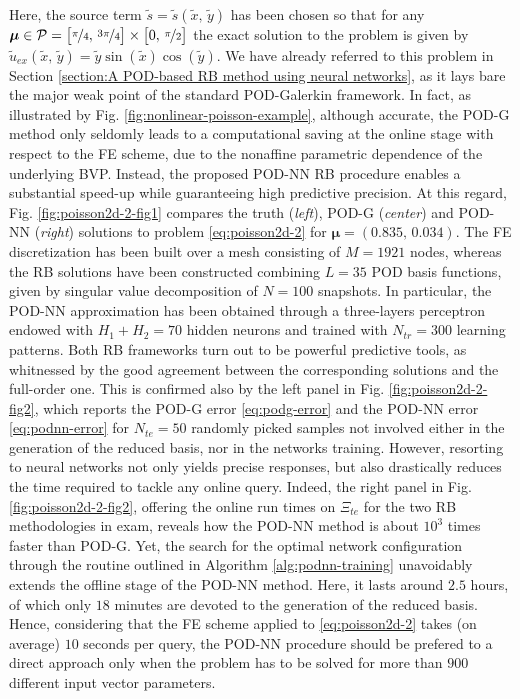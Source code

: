 \documentclass[12pt, a4paper, twoside, openright, notitlepage]{report}
\numberwithin{equation}{chapter}
\theoremstyle{theorem}
\theoremstyle{definition}
\theoremstyle{remark}
\theoremstyle{proposition}
\numberwithin{figure}{chapter}
\newcommand{\wt}[1]{\widetilde{#1}}
\newcommand{\bg}[1]{\boldsymbol{#1}}
\begin{document}
		Here, the source term $\wt{s} = \wt{s}(\wt{x}, \, \wt{y})$ has been chosen so that for any $\bg{\mu} \in \mathcal{P} = \big[ \nicefrac{\pi}{4}, \, \nicefrac{3 \pi}{4} \big] \times \big[ 0, \, \nicefrac{\pi}{2} \big]$ the exact solution to the problem is given by $\wt{u}_{ex}(\wt{x}, \, \wt{y}) = \wt{y} \sin(\wt{x}) \cos(\wt{y})$. We have already referred to this problem in Section \ref{section:A POD-based RB method using neural networks}, as it lays bare the major weak point of the standard POD-Galerkin framework. In fact, as illustrated by Fig. \ref{fig:nonlinear-poisson-example}, although accurate, the POD-G method only seldomly leads to a computational saving at the online stage with respect to the FE scheme, due to the nonaffine parametric dependence of the underlying BVP. Instead, the proposed POD-NN RB procedure enables a substantial speed-up while guaranteeing high predictive precision. At this regard, Fig. \ref{fig:poisson2d-2-fig1} compares the truth (\emph{left}), POD-G (\emph{center}) and POD-NN (\emph{right}) solutions to problem \eqref{eq:poisson2d-2} for $\bg{\mu} = (0.835, \, 0.034)$. The FE discretization has been built over a mesh consisting of $M = 1921$ nodes, whereas the RB solutions have been constructed combining $L = 35$ POD basis functions, given by singular value decomposition of $N = 100$ snapshots. In particular, the POD-NN approximation has been obtained through a three-layers perceptron endowed with $H_1 + H_2 = 70$ hidden neurons and trained with $N_{tr} = 300$ learning patterns. Both RB frameworks turn out to be powerful predictive tools, as whitnessed by the good agreement between the corresponding solutions and the full-order one. This is confirmed also by the left panel in Fig. \ref{fig:poisson2d-2-fig2}, which reports the POD-G error \eqref{eq:podg-error} and the POD-NN error \eqref{eq:podnn-error} for $N_{te} = 50$ randomly picked samples not involved either in the generation of the reduced basis, nor in the networks training. However, resorting to neural networks not only yields precise responses, but also drastically reduces the time required to tackle any online query. Indeed, the right panel in Fig. \ref{fig:poisson2d-2-fig2}, offering the online run times on $\Xi_{te}$ for the two RB methodologies in exam, reveals how the POD-NN method is about $10^3$ times faster than POD-G. Yet, the search for the optimal network configuration through the routine outlined in Algorithm \ref{alg:podnn-training} unavoidably extends the offline stage of the POD-NN method. Here, it lasts around $2.5$ hours, of which only $18$ minutes are devoted to the generation of the reduced basis. Hence, considering that the FE scheme applied to \eqref{eq:poisson2d-2} takes (on average) $10$ seconds per query, the POD-NN procedure should be prefered to a direct approach only when the problem has to be solved for more than $900$ different input vector parameters.
				
\end{document}
